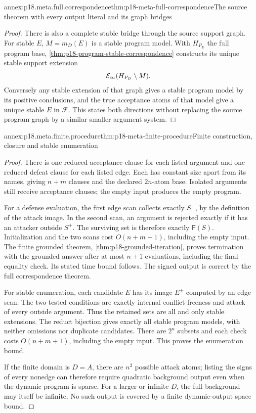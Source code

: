 \begin{annexitem}{annex:p18.meta.full.correspondence}{thm:p18-meta-full-correspondence}{The source theorem with every output literal and its graph bridges}
\begin{proof}
There is also a complete stable bridge through
the source support graph. For stable \(E\),
\(M=m_D(E)\) is a stable program model. With
\(H_{P_D}\) the full program base,
\cref{thm:p18-program-stable-correspondence}
constructs its unique stable support extension
\[
                    {\cal E}_\infty(H_{P_D}\setminus M).
\]
Conversely any stable extension of that graph
gives a stable program model by its positive
conclusions, and the true acceptance atoms of
that model give a unique stable \(E\) in
\(\mathcal F\). This states both directions
without replacing the source program graph
by a similar smaller argument system.
\end{proof}
\end{annexitem}

\begin{annexitem}{annex:p18.meta.finite.procedure}{thm:p18-meta-finite-procedure}{Finite construction, closure and stable enumeration}
\begin{proof}
There is one reduced acceptance clause for each
listed argument and one reduced defeat clause
for each listed edge. Each has constant size
apart from its names, giving \(n+m\) clauses
and the declared \(2n\)-atom base. Isolated
arguments still receive acceptance clauses;
the empty input produces the empty program.

For a defense evaluation, the first edge scan
collects exactly \(S^+\), by the definition of
the attack image. In the second scan, an
argument is rejected exactly if it has an
attacker outside \(S^+\). The surviving set
is therefore exactly \(\mathsf F(S)\).
Initialization and the two scans cost
\(O(n+m+1)\), including the empty input. The finite grounded theorem,
\cref{thm:p18-grounded-iteration}, proves
termination with the grounded answer after
at most \(n+1\) evaluations, including the
final equality check. Its stated time bound
follows. The signed output is correct by
the full correspondence theorem.

For stable enumeration, each candidate \(E\)
has its image \(E^+\) computed by an edge
scan. The two tested conditions are exactly
internal conflict-freeness and attack of
every outside argument. Thus the retained
sets are all and only stable extensions.
The reduct bijection gives exactly all
stable program models, with neither omissions
nor duplicate candidates. There are \(2^n\)
subsets and each check costs \(O(n+m+1)\),
including the empty input. This proves the
enumeration bound.

If the finite domain is \(D=A\), there
are \(n^2\) possible attack atoms; listing
the signs of every nonedge can therefore
require quadratic background output even
when the dynamic program is sparse.
For a larger or infinite \(D\), the full
background may itself be infinite.
No such output is covered by a finite
dynamic-output space bound.


\end{proof}
\end{annexitem}
